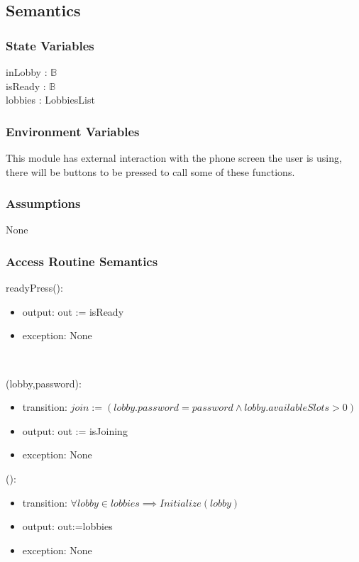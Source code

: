 \documentclass[12pt, titlepage]{article}
\begin{document}
\subsection{Semantics}

\subsubsection{State Variables}

inLobby : $\mathbb{B}$\\
isReady : $\mathbb{B}$\\
lobbies : LobbiesList

\subsubsection{Environment Variables}

This module has external interaction with the phone screen the user is using, there will be buttons to be pressed to call some of these functions.

\subsubsection{Assumptions}

None

\subsubsection{Access Routine Semantics}

\noindent readyPress():
\begin{itemize}
\item output: out := isReady
\item exception: None
\end{itemize}\

(lobby,password):
\begin{itemize}
\item transition: $join := (lobby.password=password \land lobby.availableSlots>0)$
\item output: out := isJoining
\item exception: None
\end{itemize}

():
\begin{itemize}
\item transition: $\forall lobby \in lobbies \implies Initialize(lobby)$
\item output: out:=lobbies
\item exception: None
\end{itemize}
\end{document}
